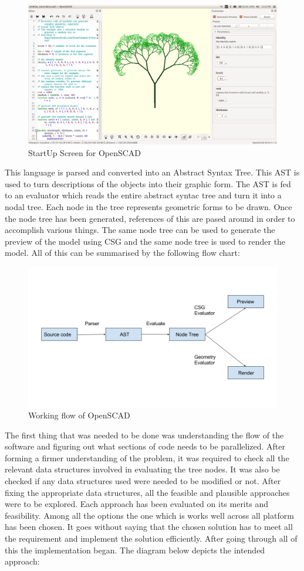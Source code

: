\begin{figure}[H]
    \centering \includegraphics[width=\linewidth]{images/output/5.png}
    \caption{StartUp Screen for OpenSCAD}
    \label{fig:1}
\end{figure}
This language is parsed and converted into an Abstract Syntax Tree. This AST is used to turn descriptions of the objects into their graphic form. The AST is fed to an evaluator which reads the entire abstract syntac tree and turn it into a nodal tree. Each node in the tree represents geometric forms to be drawn. Once the node tree has been generated, references of this are pased around in order to accomplish various things. The same node tree can be used to generate the preview of the model using CSG and the same node tree is used to render the model. All of this can be summarised by the following flow chart:
\begin{figure}[H]
    \centering 
    \includegraphics[width=\linewidth]{images/flowchart.png}
    \caption{Working flow of OpenSCAD}
\end{figure}
The first thing that was needed to be done was understanding the flow of the software and figuring out what sections of code needs to be parallelized. After forming a firmer understanding of the problem, it was required to check all the relevant data structures involved in evaluating the tree nodes. It was also be checked if any data structures used were needed to be modified or not. After fixing the appropriate data structures, all the feasible and plausible approaches were to be explored. Each approach has been evaluated on its merits and feasibility. Among all the options the one which is works well across all platform has been chosen. It goes without saying that the chosen solution has to meet all the requirement and implement the solution efficiently. After going through all of this the implementation began. The diagram below depicts the intended approach:
